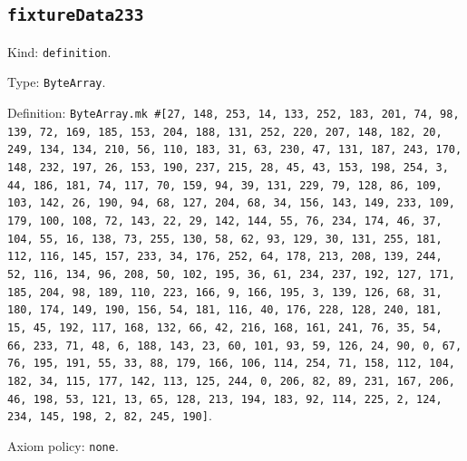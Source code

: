 \documentclass[11pt]{article}
\begin{document}
\subsection*{\texttt{fixtureData233}}
\noindent Kind: \texttt{definition}.\par
\noindent Type: \texttt{ByteArray}.\par
\noindent Definition: \texttt{ByteArray.mk \#[27, 148, 253, 14, 133, 252, 183, 201, 74, 98, 139, 72, 169, 185, 153, 204, 188, 131, 252, 220, 207, 148, 182, 20, 249, 134, 134, 210, 56, 110, 183, 31, 63, 230, 47, 131, 187, 243, 170, 148, 232, 197, 26, 153, 190, 237, 215, 28, 45, 43, 153, 198, 254, 3, 44, 186, 181, 74, 117, 70, 159, 94, 39, 131, 229, 79, 128, 86, 109, 103, 142, 26, 190, 94, 68, 127, 204, 68, 34, 156, 143, 149, 233, 109, 179, 100, 108, 72, 143, 22, 29, 142, 144, 55, 76, 234, 174, 46, 37, 104, 55, 16, 138, 73, 255, 130, 58, 62, 93, 129, 30, 131, 255, 181, 112, 116, 145, 157, 233, 34, 176, 252, 64, 178, 213, 208, 139, 244, 52, 116, 134, 96, 208, 50, 102, 195, 36, 61, 234, 237, 192, 127, 171, 185, 204, 98, 189, 110, 223, 166, 9, 166, 195, 3, 139, 126, 68, 31, 180, 174, 149, 190, 156, 54, 181, 116, 40, 176, 228, 128, 240, 181, 15, 45, 192, 117, 168, 132, 66, 42, 216, 168, 161, 241, 76, 35, 54, 66, 233, 71, 48, 6, 188, 143, 23, 60, 101, 93, 59, 126, 24, 90, 0, 67, 76, 195, 191, 55, 33, 88, 179, 166, 106, 114, 254, 71, 158, 112, 104, 182, 34, 115, 177, 142, 113, 125, 244, 0, 206, 82, 89, 231, 167, 206, 46, 198, 53, 121, 13, 65, 128, 213, 194, 183, 92, 114, 225, 2, 124, 234, 145, 198, 2, 82, 245, 190]}.\par
\noindent Axiom policy: \texttt{none}.\par
\end{document}
